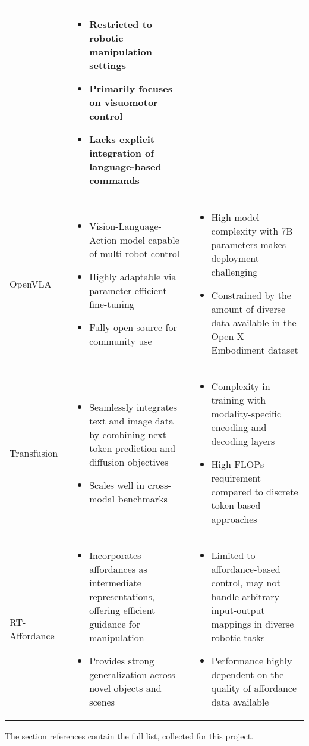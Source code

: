 \documentclass[12pt]{article}
\begin{document}
\begin{longtable}{p{5cm}|p{5cm}|p{5cm}}
\begin{itemize}
    \end{itemize} & 
    \begin{itemize}
        \item Restricted to robotic manipulation settings
        \item Primarily focuses on visuomotor control
        \item Lacks explicit integration of language-based commands
    \end{itemize} \\
    \hline
\hline
OpenVLA~\cite{Kim2024OpenVLAAO} & 
\begin{itemize}
    \item Vision-Language-Action model capable of multi-robot control
    \item Highly adaptable via parameter-efficient fine-tuning
    \item Fully open-source for community use
\end{itemize} & 
\begin{itemize}
    \item High model complexity with 7B parameters makes deployment challenging
    \item Constrained by the amount of diverse data available in the Open X-Embodiment dataset
\end{itemize} \\
\hline
Transfusion~\cite{Zhou2024TransfusionPT} & 
\begin{itemize}
    \item Seamlessly integrates text and image data by combining next token prediction and diffusion objectives
    \item Scales well in cross-modal benchmarks
\end{itemize} & 
\begin{itemize}
    \item Complexity in training with modality-specific encoding and decoding layers
    \item High FLOPs requirement compared to discrete token-based approaches
\end{itemize} \\
\hline
RT-Affordance~\cite{Nasiriany2024RTAffordanceAA} & 
\begin{itemize}
    \item Incorporates affordances as intermediate representations, offering efficient guidance for manipulation
    \item Provides strong generalization across novel objects and scenes
\end{itemize} & 
\begin{itemize}
    \item Limited to affordance-based control, may not handle arbitrary input-output mappings in diverse robotic tasks
    \item Performance highly dependent on the quality of affordance data available
\end{itemize} \\

\end{longtable}

 
 The section references contain the full list, collected for this project. 
\nocite{*} %



\end{document}
